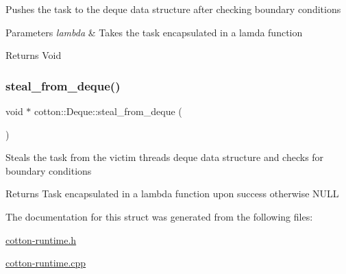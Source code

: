 Pushes the task to the deque data structure after checking boundary conditions


\begin{DoxyParams}{Parameters}
{\em lambda} & Takes the task encapsulated in a lamda function \\
\hline
\end{DoxyParams}
\begin{DoxyReturn}{Returns}
Void 
\end{DoxyReturn}
\mbox{\label{structcotton_1_1Deque_a33215b0b811484e2af94f2db16a5c15c}} 
\subsubsection{\texorpdfstring{steal\+\_\+from\+\_\+deque()}{steal\_from\_deque()}}
{\footnotesize\ttfamily void $\ast$ cotton\+::\+Deque\+::steal\+\_\+from\+\_\+deque (\begin{DoxyParamCaption}{ }\end{DoxyParamCaption})}

Steals the task from the victim thread\textquotesingle{}s deque data structure and checks for boundary conditions

\begin{DoxyReturn}{Returns}
Task encapsulated in a lambda function upon success otherwise N\+U\+LL 
\end{DoxyReturn}


The documentation for this struct was generated from the following files\+:\begin{DoxyCompactItemize}
\item 
\mbox{\hyperlink{cotton-runtime_8h}{cotton-\/runtime.\+h}}\item 
\mbox{\hyperlink{cotton-runtime_8cpp}{cotton-\/runtime.\+cpp}}\end{DoxyCompactItemize}
